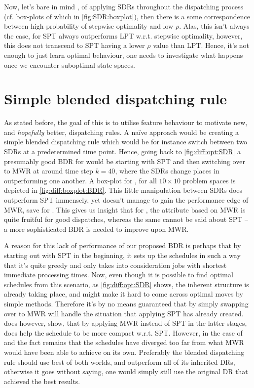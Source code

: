 Now, let's bare in mind \namerho, of applying SDRs throughout the dispatching 
process (cf. box-plots of which in \cref{fig:SDR:boxplot}), then there is a 
some correspondence between high probability of stepwise optimality and low 
$\rho$. Alas, this isn't always the case, for  SPT always 
outperforms LPT w.r.t. stepwise optimality, however, this does not transcend to 
SPT having a lower $\rho$ value than LPT. Hence, it's not enough to just learn 
optimal behaviour, one needs to investigate what happens once we encounter 
suboptimal state spaces.

\section{Simple blended dispatching rule}\label{sec:diff:opt:bdr}
As stated before, the goal of this  is to utilise feature behaviour to motivate new, and \emph{hopefully} better, dispatching rules. 
A na\"ive approach would be creating a simple blended dispatching rule which would be for instance switch between two SDRs at a predetermined time point. Hence, going back to \cref{fig:diff:opt:SDR} a presumably good BDR for   would be starting with SPT and then switching over to MWR at around time step $k=40$, where the SDRs change places in outperforming one another. A box-plot for \namerho, for all $10\times10$ problem spaces is depicted in \cref{fig:diff:boxplot:BDR}. This little manipulation between SDRs does outperform SPT immensely, yet doesn't manage to gain the performance edge of MWR, save for . This gives us insight that for \jsp, the attribute based on MWR is quite fruitful for good dispatches, whereas the same cannot be said about SPT -- a more sophisticated BDR is needed to improve upon MWR. 

A reason for this lack of performance of our proposed BDR is perhaps that by 
starting out with SPT in the beginning, it sets up the schedules in such a way 
that it's quite greedy and only takes into consideration jobs with shortest 
immediate processing times. Now, even though it is possible to find optimal 
schedules from this scenario, as \cref{fig:diff:opt:SDR} shows, the inherent 
structure is already taking place, and might make it hard to come across 
optimal moves by simple methods. Therefore it's by no means guaranteed that by 
simply swapping over to MWR will handle the situation that applying SPT has 
already created.  does however, show, that by 
applying MWR instead of SPT in the latter stages, does help the schedule to be 
more compact w.r.t. SPT. However, in the case of  and 
 the fact remains that the schedules have diverged too far from 
what MWR would have been able to achieve on its own. Preferably the blended 
dispatching rule should use  best of both worlds, and outperform all of its 
inherited DRs, otherwise it goes without saying, one would simply still use the 
original DR that achieved the best results.

